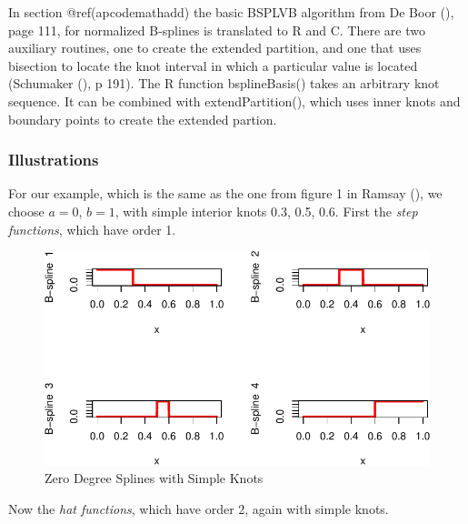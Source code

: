 \documentclass[
  12pt,
  letterpaper,
  DIV=11,
  numbers=noendperiod]{scrreprt}
\theoremstyle{remark}
\begin{document}
In section @ref(apcodemathadd) the basic BSPLVB algorithm from De Boor
(), page 111, for normalized B-splines is
translated to R and C. There are two auxiliary routines, one to create
the extended partition, and one that uses bisection to locate the knot
interval in which a particular value is located (Schumaker
(), p 191). The R function
bsplineBasis() takes an arbitrary knot sequence. It can be combined with
extendPartition(), which uses inner knots and boundary points to create
the extended partion.

\subsubsection{Illustrations}\label{illustrations}

For our example, which is the same as the one from figure 1 in Ramsay
(), we choose \(a=0\), \(b=1\), with
simple interior knots 0.3, 0.5, 0.6. First the \emph{step functions},
which have order 1.

\begin{figure}[H]

{\centering \includegraphics{splinical_files/figure-pdf/order1mult1-1.pdf}

}

\caption{Zero Degree Splines with Simple Knots}

\end{figure}%

Now the \emph{hat functions}, which have order 2, again with simple
knots.
\end{document}
